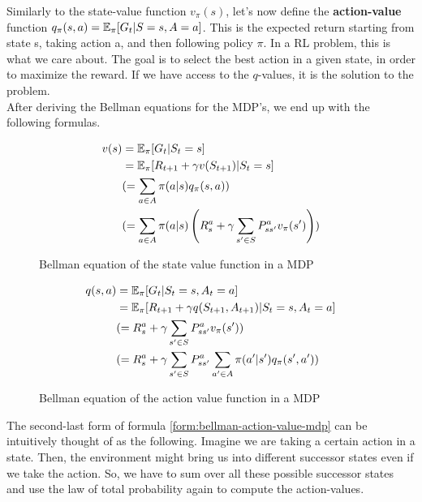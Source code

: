 Similarly to the state-value function $v_\pi(s)$, let's now define the \textbf{action-value} function $q_\pi(s, a) = \operatorname{\mathbb{E}}_\pi[G_t | S = s, A = a]$. This is the expected return starting from state s, taking action a, and then following policy $\pi$. In a RL problem, this is what we care about. The goal is to select the best action in a given state, in order to maximize the reward. If we have access to the $q$-values, it is the solution to the problem.\\

After deriving the Bellman equations for the MDP's, we end up with the following formulas.

\begin{figure}[h]
	\begin{equation}
		\begin{aligned}
			v(s)&= \operatorname{\mathbb{E}}_\pi[G_t | S_t = s]\\
				&= \operatorname{\mathbb{E}}_\pi[R_{t+1} + \gamma v(S_{t+1}) | S_t = s]\\
				&(= \sum_{a \in A}\pi(a|s)q_\pi(s, a))\\
				&(= \sum_{a \in A}\pi(a|s)\left(R^a_s + \gamma \sum_{s' \in S} P^a_{ss'}v_\pi(s')\right))
		\end{aligned}
	\end{equation}
	\caption{Bellman equation of the state value function in a MDP}
	\label{form:bellman-state-value-mdp}
\end{figure}

\begin{figure}[h]
	\begin{equation}
		\begin{aligned}
			q(s, a) &= \operatorname{\mathbb{E}}_\pi[G_t | S_t = s, A_t = a]\\
					&= \operatorname{\mathbb{E}}_\pi[R_{t+1} + \gamma q(S_{t+1}, A_{t+1}) | S_t = s, A_t = a]\\
					&(= R^a_s + \gamma \sum_{s' \in S} P^a_{ss'}v_\pi(s'))\\	
					&(= R^a_s + \gamma \sum_{s' \in S} P^a_{ss'}\sum_{a' \in A}\pi(a'|s')q_\pi(s', a'))	
		\end{aligned}
	\end{equation}
	\caption{Bellman equation of the action value function in a MDP}
	\label{form:bellman-action-value-mdp}
\end{figure}

The second-last form of formula \eqref{form:bellman-action-value-mdp} can be intuitively thought of as the following. Imagine we are taking a certain action in a state. Then, the environment might bring us into different successor states even if we take the action. So, we have to sum over all these possible successor states and use the law of total probability again to compute the action-values.\\

